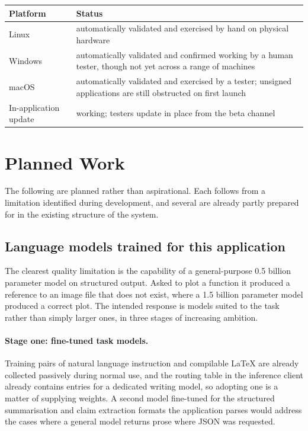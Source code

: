 \documentclass[11pt,a4paper]{article}
\begin{document}
\begin{center}
\small
\begin{tabularx}{\linewidth}{@{}lX@{}}
\toprule
\textbf{Platform} & \textbf{Status} \\
\midrule
Linux & automatically validated and exercised by hand on physical hardware \\
Windows & automatically validated and confirmed working by a human tester, though not yet across a range of machines \\
macOS & automatically validated and exercised by a tester; unsigned applications are still obstructed on first launch \\
In-application update & working; testers update in place from the beta channel \\
\bottomrule
\end{tabularx}
\end{center}

\section{Planned Work}

The following are planned rather than aspirational. Each follows from a
limitation identified during development, and several are already partly
prepared for in the existing structure of the system.

\subsection{Language models trained for this application}

The clearest quality limitation is the capability of a general-purpose 0.5
billion parameter model on structured output. Asked to plot a function it
produced a reference to an image file that does not exist, where a 1.5 billion
parameter model produced a correct plot. The intended response is models suited
to the task rather than simply larger ones, in three stages of increasing
ambition.

\paragraph{Stage one: fine-tuned task models.} Training pairs of natural
language instruction and compilable LaTeX are already collected passively during
normal use, and the routing table in the inference client already contains
entries for a dedicated writing model, so adopting one is a matter of supplying
weights. A second model fine-tuned for the structured summarisation and claim
extraction formats the application parses would address the cases where a
general model returns prose where JSON was requested.
\end{document}
